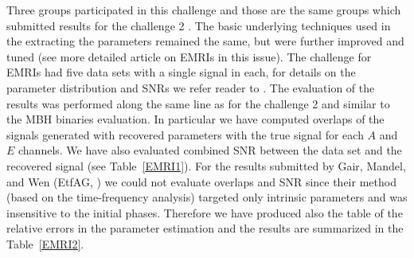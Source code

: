 \documentclass{iopart}
\begin{document}
Three groups participated in this challenge and those are the same groups which 
submitted results for the challenge 2 \cite{mldcgwdaw2}. The basic underlying techniques 
used in the extracting the parameters remained the same, but were further 
improved and tuned (see more detailed article on EMRIs in this issue).
The challenge for EMRIs had five data sets with a single signal in each, for details on the 
parameter distribution and SNRs we refer reader to \cite{mldcgwdaw2}. The evaluation of the 
results was performed along the same line as for the challenge 2 and similar to the MBH binaries 
evaluation. In particular we have computed overlaps of the signals generated with recovered 
parameters with the true signal for each $A$ and $E$ channels. We have also evaluated 
combined SNR between the data set and the recovered signal (see Table~\ref{EMRI1}).
 For the results submitted by Gair, Mandel, and Wen (EtfAG, \cite{gmw}) we could not evaluate overlaps and 
 SNR since their method (based on the time-frequency analysis) targeted only intrinsic parameters and was insensitive to the initial phases. Therefore we have produced also the table of the relative errors in the parameter estimation and the results are summarized in the 
 Table~\ref{EMRI2}.
 
\end{document}
